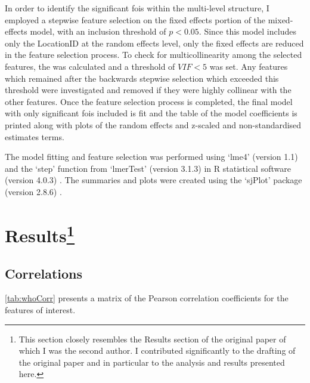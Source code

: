 In order to identify the significant \glspl{foi} within the multi-level structure, I employed a stepwise feature selection on the fixed effects portion of the mixed-effects model, with an inclusion threshold of $p < 0.05$. Since this model includes only the LocationID at the random effects level, only the fixed effects are reduced in the feature selection process. To check for multicollinearity among the selected features, the  was calculated and a threshold of $VIF < 5$ was set. Any features which remained after the backwards stepwise selection which exceeded this threshold were investigated and removed if they were highly collinear with the other features. Once the feature selection process is completed, the final model with only significant \glspl{foi} included is fit and the table of the model coefficients is printed along with plots of the random effects and z-scaled and non-standardised estimates terms.

The model fitting and feature selection was performed using `lme4' (version 1.1) and the `step' function from `lmerTest' (version 3.1.3) \citep{Kuznetsova2017lmerTest} in R statistical software (version 4.0.3) \citep{RCT2018R}. The summaries and plots were created using the `sjPlot' package (version 2.8.6) \citep{Luedecke2021sjPlot}.

\section[Results]{Results\footnote{This section closely resembles the Results section of the original paper \citep{Erfanian2021Psychological} of which I was the second author. I contributed significantly to the drafting of the original paper and in particular to the analysis and results presented here.}}

\subsection{Correlations}

\cref{tab:whoCorr} presents a matrix of the Pearson correlation coefficients for the features of interest. 


